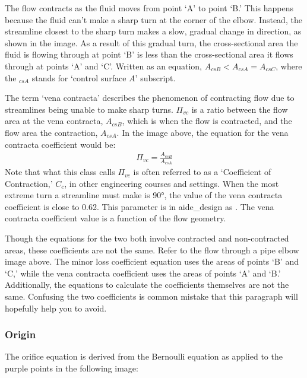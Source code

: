\documentclass[letterpaper,10pt,english]{sphinxmanual}
\begin{document}
The flow contracts as the fluid moves from point ‘A’ to point ‘B.’ This happens because the fluid can’t make a sharp turn at the corner of the elbow. Instead, the streamline closest to the sharp turn makes a slow, gradual change in direction, as shown in the image. As a result of this gradual turn, the cross-sectional area the fluid is flowing through at point ‘B’ is less than the cross-sectional area it flows through at points ‘A’ and ‘C’. Written as an equation, \(A_{csB} < A_{csA} = A_{csC}\), where the \(_{csA}\) stands for ‘control surface \(A\)’ subscript.

The term ‘vena contracta’ describes the phenomenon of contracting flow due to streamlines being unable to make sharp turns. \(\Pi_{vc}\) is a ratio between the flow area at the vena contracta, \(A_{csB}\), which is when the flow is  contracted, and the flow area  the contraction, \(A_{csA}\). In the image above, the equation for the vena contracta coefficient would be:
\begin{equation}\label{equation:Fluids_Review/Fluids_Review_Design:Fluids_Review/Fluids_Review_Design:28}
\begin{split}\Pi_{vc} = \frac{A_{csB}}{A_{csA}}\end{split}
\end{equation}
Note that what this class calls \(\Pi_{vc}\) is often referred to as a ‘Coefficient of Contraction,’ \(C_c\), in other engineering courses and settings. When the most extreme turn a streamline must make
is 90°, the value of the vena contracta coefficient is close to 0.62. This parameter is in aide\_design as . The vena contracta coefficient value is a function of the flow geometry.

 Though the equations for the two both involve contracted and non-contracted areas, these coefficients are not the same. Refer to the flow through a pipe elbow image above. The minor loss coefficient equation uses the areas of points ‘B’ and ‘C,’ while the vena contracta coefficient uses the areas of points ‘A’ and ‘B.’ Additionally, the equations to calculate the coefficients themselves are not the same. Confusing the two coefficients is common mistake that this paragraph will hopefully help you to avoid.


\subsubsection{Origin}
\label{\detokenize{Fluids_Review/Fluids_Review_Design:origin}}
The orifice equation is derived from the Bernoulli equation as applied to the purple points in the following image:
\end{document}
